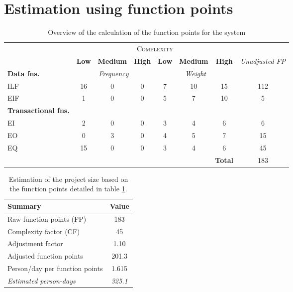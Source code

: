\section{Estimation using function points}

\begin{table}[hbtp]
\centering
\begin{tabular}{|l|c|c|c|c|c|c|c|}
\cline{2-7}
\multicolumn{1}{c}{} & \multicolumn{6}{|c|}{\textsc{Complexity}} & \multicolumn{1}{c}{}  \\ \cline{2-8}
\multicolumn{1}{c|}{} & \textbf{Low} & \textbf{Medium} & \textbf{High} & \textbf{Low} & \textbf{Medium} & \textbf{High} & \multirow{2}{*}{\textit{Unadjusted FP}} \\ \cline{1-7}
\textbf{Data fns.} & \multicolumn{3}{|c|}{\textit{Frequency}} &  \multicolumn{3}{|c|}{\textit{Weight}} & \\ \hline
ILF 	& 16 & 0 & 0 & 7 & 10 & 15 & 112 	\\ \hline
EIF 	& 1  & 0 & 0 & 5 & 7  & 10 & 5		\\ \hline
\textbf{Transactional fns.} & \multicolumn{7}{|c|}{} \\ \hline
EI 		& 2  & 0 & 0 & 3 & 4  & 6  & 6 		\\ \hline
EO 		& 0  & 3 & 0 & 4 & 5  & 7  & 15		\\ \hline
EQ		& 15 & 0 & 0 & 3 & 4  & 6  & 45		\\ \hline
\multicolumn{6}{c|}{} & \textbf{Total} & 183 \\ \cline{7-8}
\end{tabular}
\caption{Overview of the calculation of the function points for the system}
\label{tblFunctionPoints}
\end{table}

\begin{table}[hbtp]
\centering
\begin{tabular}{l|c}
\textbf{Summary} & \textbf{Value} \\ \hline
Raw function points (FP) & 183 \\
Complexity factor (CF) & 45 \\
Adjustment factor & 1.10 \\
Adjusted function points & 201.3 \\
Person/day per function points & 1.615 \\ \hline
\textit{Estimated person-days} & \textit{325.1}
\end{tabular}
\caption{Estimation of the project size based on the function points detailed in table \ref{tblFunctionPoints}.}
\label{tblFPEstimate}
\end{table}

